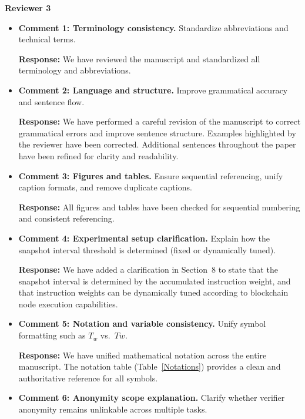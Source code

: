 \documentclass[3p]{elsarticle}
\theoremstyle{remark}
\begin{document}
\textbf{Reviewer 3}
\begin{itemize}

    \item \textbf{Comment 1: Terminology consistency.}  
    Standardize abbreviations and technical terms.

    \textbf{Response:}  
    We have reviewed the manuscript and standardized all terminology and abbreviations.  

    \item \textbf{Comment 2: Language and structure.}  
    Improve grammatical accuracy and sentence flow.

    \textbf{Response:}  
    We have performed a careful revision of the manuscript to correct grammatical errors and improve sentence structure.  
    Examples highlighted by the reviewer have been corrected.     Additional sentences throughout the paper have been refined for clarity and readability.

    \item \textbf{Comment 3: Figures and tables.}  
    Ensure sequential referencing, unify caption formats, and remove duplicate captions.

    \textbf{Response:}  
    All figures and tables have been checked for sequential numbering and consistent referencing.  

    \item \textbf{Comment 4: Experimental setup clarification.}  
    Explain how the snapshot interval threshold is determined (fixed or dynamically tuned).

    \textbf{Response:}  
    We have added a clarification in Section~8 to state that the snapshot interval is determined by the accumulated instruction weight, and that instruction weights can be dynamically tuned according to blockchain node execution capabilities.  

    \item \textbf{Comment 5: Notation and variable consistency.}  
    Unify symbol formatting such as $T_w$ vs.\ $Tw$.

    \textbf{Response:}  
    We have unified mathematical notation across the entire manuscript.  The notation table (Table~\ref{Notations}) provides a clean and authoritative reference for all symbols.

    \item \textbf{Comment 6: Anonymity scope explanation.}  
    Clarify whether verifier anonymity remains unlinkable across multiple tasks.


\end{itemize}
\end{document}
